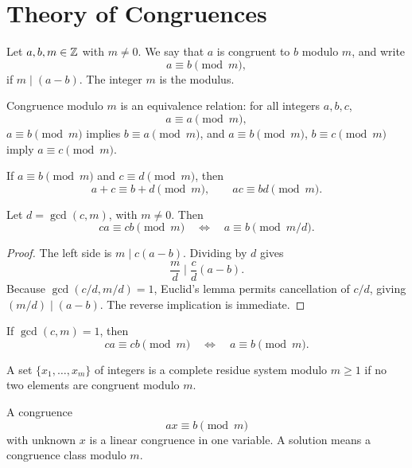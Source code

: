 \chapter{Theory of Congruences}

\begin{de}
Let $a,b,m\in\mathbb{Z}$ with $m\ne0$.  We say that $a$ is congruent to $b$ modulo $m$, and write
\[
 a\equiv b\pmod m,
\]
if $m\mid(a-b)$.  The integer $m$ is the modulus.
\end{de}

\begin{thm}
Congruence modulo $m$ is an equivalence relation: for all integers $a,b,c$,
\[
 a\equiv a\pmod m,
\]
$a\equiv b\pmod m$ implies $b\equiv a\pmod m$, and
$a\equiv b\pmod m$, $b\equiv c\pmod m$ imply $a\equiv c\pmod m$.
\end{thm}

\begin{thm}
If $a\equiv b\pmod m$ and $c\equiv d\pmod m$, then
\[
 a+c\equiv b+d\pmod m,
 \qquad
 ac\equiv bd\pmod m.
\]
\end{thm}

\begin{thm}[cancellation]
Let $d=\gcd(c,m)$, with $m\ne0$.  Then
\[
 ca\equiv cb\pmod m
 \quad\Longleftrightarrow\quad
 a\equiv b\pmod{m/d}.
\]
\end{thm}
\begin{proof}
The left side is $m\mid c(a-b)$.  Dividing by $d$ gives
\[
 \frac md\mid \frac cd(a-b).
\]
Because $\gcd(c/d,m/d)=1$, Euclid's lemma permits cancellation of $c/d$, giving $(m/d)\mid(a-b)$.  The reverse implication is immediate.
\end{proof}

\begin{cor}
If $\gcd(c,m)=1$, then
\[
 ca\equiv cb\pmod m\quad\Longleftrightarrow\quad a\equiv b\pmod m.
\]
\end{cor}

\begin{de}
A set $\{x_1,\ldots,x_m\}$ of integers is a complete residue system modulo $m\ge1$ if no two elements are congruent modulo $m$.
\end{de}

\begin{de}
A congruence
\[
 ax\equiv b\pmod m
\]
with unknown $x$ is a linear congruence in one variable.  A solution means a congruence class modulo $m$.
\end{de}


